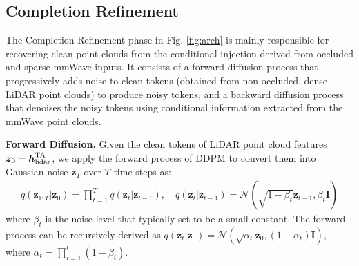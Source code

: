 \documentclass{article}
\begin{document}
\subsection{Completion Refinement}
The Completion Refinement phase in Fig. \ref{fig:arch} is mainly responsible for recovering clean point clouds from the conditional injection derived from occluded and sparse mmWave inputs. It consists of a forward diffusion process that progressively adds noise to clean tokens (obtained from non-occluded, dense LiDAR point clouds) to produce noisy tokens, and a backward diffusion process that denoises the noisy tokens using conditional information extracted from the mmWave point clouds.

\textbf{Forward Diffusion.}
Given the clean tokens of LiDAR point cloud features $\boldsymbol{z}_0 = \boldsymbol{h}_{\rm{lidar}}^{\rm{TA}}$, we apply the forward process of DDPM \cite{ho2020denoising,song2020score} to convert them into Gaussian noise $\boldsymbol{z}_T$ over $T$ time steps as:
\begin{align}
  q(\boldsymbol{z}_{1:T}|\boldsymbol{z}_0)=\prod_{t=1}^T q(\boldsymbol{z}_t|\boldsymbol{z}_{t-1}), \quad q(\boldsymbol{z}_t|\boldsymbol{z}_{t-1}) = \mathcal{N}(\sqrt{1-\beta_t} \boldsymbol{z}_{t-1}, \beta_t \textbf{I})
\end{align}
where $\beta_t$ is the noise level that typically set to be a small constant. The forward process 
can be recursively derived as $q(\boldsymbol{z}_t|\boldsymbol{z}_0)=\mathcal{N}(\sqrt{\alpha_t} \boldsymbol{z}_0, (1-\alpha_t) \textbf{I})$, where $\alpha_t=\prod_{i=1}^{t} (1-\beta_i)$.
\end{document}
